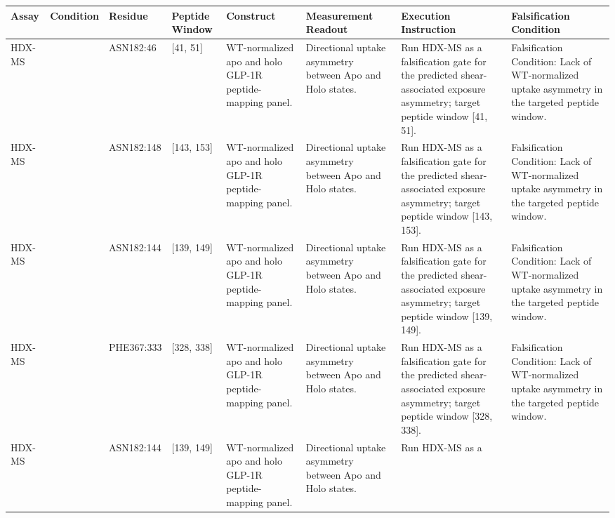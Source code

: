 \documentclass[11pt,a4paper]{article}
\begin{document}
\begingroup
\scriptsize
\renewcommand{\arraystretch}{1.05}
\setlength{\tabcolsep}{2pt}
\begin{xltabular}{\textwidth}{@{}>{\RaggedRight\arraybackslash}X >{\RaggedRight\arraybackslash}X >{\RaggedRight\arraybackslash}X >{\RaggedRight\arraybackslash}X >{\RaggedRight\arraybackslash}X >{\RaggedRight\arraybackslash}X >{\RaggedRight\arraybackslash}X >{\RaggedRight\arraybackslash}X@{}}
\toprule\noalign{}
Assay & Condition & Residue & Peptide Window & Construct & Measurement Readout & Execution
Instruction & Falsification Condition \\
\midrule\noalign{}
\endhead
\bottomrule\noalign{}
\endlastfoot
HDX-MS &  & ASN182:46 & {[}41, 51{]} & WT-normalized apo and holo GLP-1R
peptide-mapping panel. & Directional uptake asymmetry between Apo and Holo states. & Run HDX-MS as a
falsification gate for the predicted shear-associated exposure asymmetry; target peptide window
{[}41, 51{]}. & Falsification Condition: Lack of WT-normalized uptake asymmetry in the targeted
peptide window. \\
HDX-MS &  & ASN182:148 & {[}143, 153{]} & WT-normalized apo and holo GLP-1R
peptide-mapping panel. & Directional uptake asymmetry between Apo and Holo states. & Run HDX-MS as a
falsification gate for the predicted shear-associated exposure asymmetry; target peptide window
{[}143, 153{]}. & Falsification Condition: Lack of WT-normalized uptake asymmetry in the targeted
peptide window. \\
HDX-MS &  & ASN182:144 & {[}139, 149{]} & WT-normalized apo and holo GLP-1R
peptide-mapping panel. & Directional uptake asymmetry between Apo and Holo states. & Run HDX-MS as a
falsification gate for the predicted shear-associated exposure asymmetry; target peptide window
{[}139, 149{]}. & Falsification Condition: Lack of WT-normalized uptake asymmetry in the targeted
peptide window. \\
HDX-MS &  & PHE367:333 & {[}328, 338{]} & WT-normalized apo and holo GLP-1R
peptide-mapping panel. & Directional uptake asymmetry between Apo and Holo states. & Run HDX-MS as a
falsification gate for the predicted shear-associated exposure asymmetry; target peptide window
{[}328, 338{]}. & Falsification Condition: Lack of WT-normalized uptake asymmetry in the targeted
peptide window. \\
HDX-MS &  & ASN182:144 & {[}139, 149{]} & WT-normalized apo and holo GLP-1R
peptide-mapping panel. & Directional uptake asymmetry between Apo and Holo states. & Run HDX-MS as a

\end{xltabular}
\end{document}
